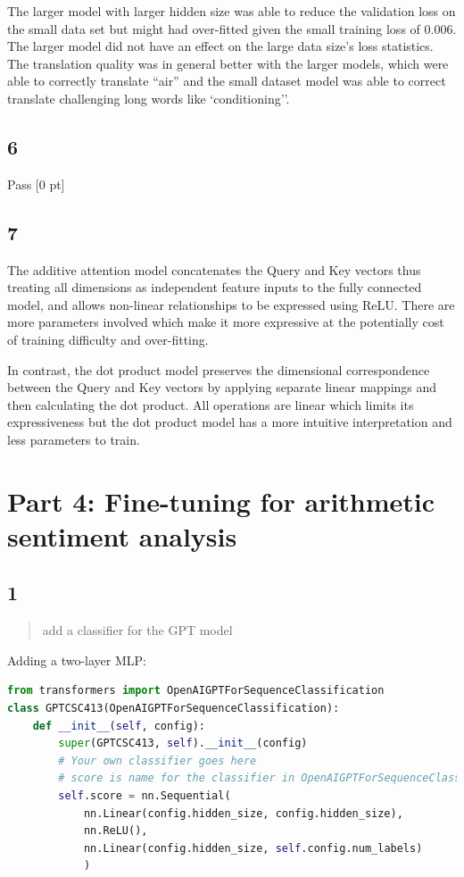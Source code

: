 \documentclass{article}
\begin{document}
The larger model with larger hidden size was able to reduce the validation loss on the small data set but might had over-fitted given the small training loss of 0.006. The larger model did not have an effect on the large data size's loss statistics. The translation quality was in general better with the larger models, which were able to correctly translate ``air'' and the small dataset model was able to correct translate challenging long words like `conditioning''.

\subsection*{6} 

Pass [0 pt]

\subsection*{7}

The additive attention model concatenates the Query and Key vectors thus treating all dimensions as independent feature inputs to the fully connected model, and allows non-linear relationships to be expressed using ReLU. There are more parameters involved which make it more expressive at the potentially cost of training difficulty and over-fitting. 

In contrast, the dot product model preserves the dimensional correspondence between the Query and Key vectors by applying separate linear mappings and then calculating the dot product. All operations are linear which limits its expressiveness but the dot product model has a more intuitive interpretation and less parameters to train.


\pagebreak
\section*{Part 4: Fine-tuning for arithmetic sentiment analysis}

\subsection*{1}

\begin{quote}
add a classifier for the GPT model
\end{quote}

Adding a two-layer MLP:

\begin{lstlisting}[language=Python]
from transformers import OpenAIGPTForSequenceClassification
class GPTCSC413(OpenAIGPTForSequenceClassification):
    def __init__(self, config):
        super(GPTCSC413, self).__init__(config)
        # Your own classifier goes here
        # score is name for the classifier in OpenAIGPTForSequenceClassification, similar as the self.classifier in BertForSequenceClassification
        self.score = nn.Sequential(
            nn.Linear(config.hidden_size, config.hidden_size),
            nn.ReLU(),
            nn.Linear(config.hidden_size, self.config.num_labels)
            )


\end{lstlisting}
\end{document}
